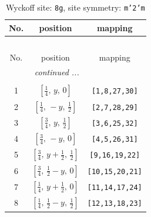 \documentclass[fleqn,8pt]{jsarticle}
\begin{document}
\begin{longtable}{ccc}
\caption{Wyckoff site: {\tt 8g}, site symmetry: {\tt m'2'm}}
 \\
 \hline \hline
No. & position & mapping \\ \hline \endfirsthead

\multicolumn{2}{l}{\tablename\ \thetable{}} \\
 \hline \hline
No. & position & mapping \\ \hline \endhead

 \hline \hline
\multicolumn{2}{r}{\footnotesize\it continued ...} \\ \endfoot

 \hline \hline
\multicolumn{2}{r}{} \\ \endlastfoot

1 & $\left[ \frac{1}{4},\, y,\, 0 \right]$ & {\tt [1,8,27,30]} \\ \hline
2 & $\left[ \frac{1}{4},\, - y,\, \frac{1}{2} \right]$ & {\tt [2,7,28,29]} \\ \hline
3 & $\left[ \frac{3}{4},\, y,\, \frac{1}{2} \right]$ & {\tt [3,6,25,32]} \\ \hline
4 & $\left[ \frac{3}{4},\, - y,\, 0 \right]$ & {\tt [4,5,26,31]} \\ \hline
5 & $\left[ \frac{3}{4},\, y + \frac{1}{2},\, \frac{1}{2} \right]$ & {\tt [9,16,19,22]} \\ \hline
6 & $\left[ \frac{3}{4},\, \frac{1}{2} - y,\, 0 \right]$ & {\tt [10,15,20,21]} \\ \hline
7 & $\left[ \frac{1}{4},\, y + \frac{1}{2},\, 0 \right]$ & {\tt [11,14,17,24]} \\ \hline
8 & $\left[ \frac{1}{4},\, \frac{1}{2} - y,\, \frac{1}{2} \right]$ & {\tt [12,13,18,23]} \\
\end{longtable}
\renewcommand{\arraystretch}{1.2}
\end{document}
